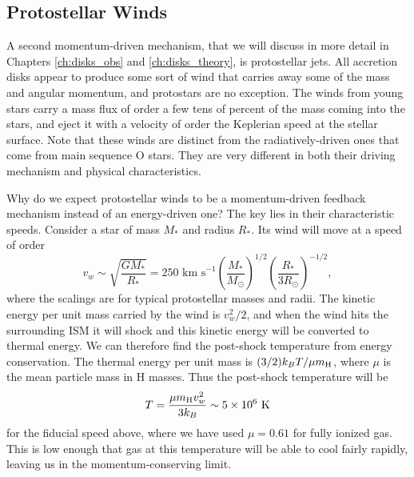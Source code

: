 \subsection{Protostellar Winds}

A second momentum-driven mechanism, that we will discuss in more detail in Chapters \ref{ch:disks_obs} and \ref{ch:disks_theory}, is protostellar jets. All accretion disks appear to produce some sort of wind that carries away some of the mass and angular momentum, and protostars are no exception. The winds from young stars carry a mass flux of order a few tens of percent of the mass coming into the stars, and eject it with a velocity of order the Keplerian speed at the stellar surface. Note that these winds are distinct from the radiatively-driven ones that come from main sequence O stars. They are very different in both their driving mechanism and physical characteristics.

Why do we expect protostellar winds to be a momentum-driven feedback mechanism instead of an energy-driven one? The key lies in their characteristic speeds. Consider a star of mass $M_*$ and radius $R_*$. Its wind will move at a speed of order
\begin{equation}
v_w \sim \sqrt{\frac{GM_*}{R_*}} = 250\mbox{ km s}^{-1}\left(\frac{M_*}{M_\odot}\right)^{1/2} \left(\frac{R_*}{3R_\odot}\right)^{-1/2},
\end{equation}
where the scalings are for typical protostellar masses and radii. The kinetic energy per unit mass carried by the wind is $v_w^2/2$, and when the wind hits the surrounding ISM it will shock and this kinetic energy will be converted to thermal energy. We can therefore find the post-shock temperature from energy conservation. The thermal energy per unit mass is
$(3/2) k_B T/\mu m_{\rm H}$, where $\mu$ is the mean particle mass in H masses. Thus the post-shock temperature will be
\begin{equation}
T = \frac{\mu m_{\rm H} v_w^2}{3 k_B} \sim 5 \times 10^6\mbox{ K}
\end{equation}
for the fiducial speed above, where we have used $\mu=0.61$ for fully ionized gas. This is low enough that gas at this temperature will be able to cool fairly rapidly, leaving us in the momentum-conserving limit.

